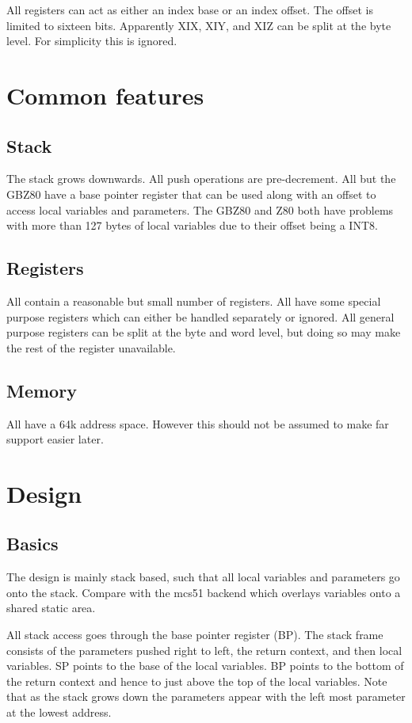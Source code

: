 \documentclass{article}
\begin{document}
All registers can act as either an index base or an index offset.  The
offset is limited to sixteen bits.  Apparently XIX, XIY, and XIZ can
be split at the byte level.  For simplicity this is ignored.

\section{Common features}
\subsection{Stack}
The stack grows downwards.  All push operations are pre-decrement.
All but the GBZ80 have a base pointer register that can be used along
with an offset to access local variables and parameters.  The GBZ80 and
Z80 both have problems with more than 127 bytes of local variables due
to their offset being a INT8.

\subsection{Registers}
All contain a reasonable but small number of registers.  All have some
special purpose registers which can either be handled separately or
ignored.  All general purpose registers can be split at the byte and
word level, but doing so may make the rest of the register
unavailable.

\subsection{Memory}
All have a 64k address space.  However this should not be assumed to make
far support easier later.

\section{Design}
\subsection{Basics}
The design is mainly stack based, such that all local variables and
parameters go onto the stack.  Compare with the mcs51 backend which
overlays variables onto a shared static area.

All stack access goes through the base pointer register (BP).  The
stack frame consists of the parameters pushed right to left, the
return context, and then local variables.  SP points to the base of
the local variables.  BP points to the bottom of the return context
and hence to just above the top of the local variables.  Note that as
the stack grows down the parameters appear with the left most
parameter at the lowest address.
\end{document}
